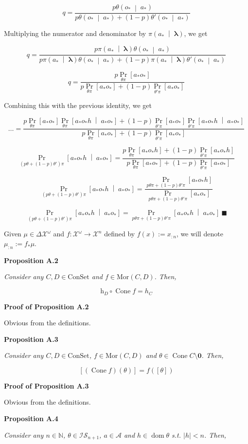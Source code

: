 \documentclass[a4paper]{article}
\newcommand{\Co}[1]{}
\DeclareMathOperator{\Dom}{dom}
\newcommand{\AP}[1]{\left(#1\right)}
\newcommand{\AB}[1]{\left[#1\right]}
\newcommand{\APM}[2]{\left(#1\;\middle\vert\;#2\right)}
\newcommand{\ABM}[2]{\left[#1\;\middle\vert\;#2\right]}
\newcommand{\Abs}[1]{\left\vert #1 \right\vert}
\newcommand{\Pa}[2]{\underset{#1}{\operatorname{Pr}}\AB{#2}}
\newcommand{\CP}[3]{\underset{#1}{\operatorname{Pr}}\ABM{#2}{#3}}
\newcommand{\Nats}{\mathbb{N}}
\newcommand{\Mor}{\mathrm{Mor}}
\newcommand{\Estr}{\boldsymbol{\lambda}} %
\newcommand{\A}{\mathcal{A}}
\newcommand{\Con}{{\boldsymbol{\mathrm{ConSet}}}}
\DeclareMathOperator{\Cone}{Cone}
\newcommand{\Ht}{\mathrm{h}}
\newcommand{\IS}{\mathcal{IS}}
\newcommand{\X}{\mathcal{X}}
\begin{document}
$$q=\frac{p\theta\APM{o_*}{a_*}}{p\theta\APM{o_*}{a_*}+(1-p)\theta'\APM{o_*}{a_*}}$$

Multiplying the numerator and denominator by $\pi\APM{a_*}{\Estr}$, we get

$$q=\frac{p\pi\APM{a_*}{\Estr}\theta\APM{o_*}{a_*}}{p\pi\APM{a_*}{\Estr}\theta\APM{o_*}{a_*}+(1-p)\pi\APM{a_*}{\Estr}\theta'\APM{o_*}{a_*}}$$

$$q=\frac{p\Pa{\theta\pi}{a_*o_*}}{p\Pa{\theta\pi}{a_*o_*}+(1-p)\Pa{\theta'\pi}{a_*o_*}}$$

Combining this with the previous identity, we get 

$$\ldots=\frac{p\Pa{\theta\pi}{a_*o_*}\CP{\theta\pi}{a_*o_*h}{a_*o_*}+(1-p)\Pa{\theta'\pi}{a_*o_*}\CP{\theta'\pi}{a_*o_*h}{a_*o_*}}{p\Pa{\theta\pi}{a_*o_*}+(1-p)\Pa{\theta'\pi}{a_*o_*}}$$

$$\CP{\AP{p\theta+(1-p)\theta'}\pi}{a_*o_*h}{a_*o_*}=\frac{p\Pa{\theta\pi}{a_*o_*h}+(1-p)\Pa{\theta'\pi}{a_*o_*h}}{p\Pa{\theta\pi}{a_*o_*}+(1-p)\Pa{\theta'\pi}{a_*o_*}}$$

$$\CP{\AP{p\theta+(1-p)\theta'}\pi}{a_*o_*h}{a_*o_*}=\frac{\Pa{p\theta\pi+(1-p)\theta'\pi}{a_*o_*h}}{\Pa{p\theta\pi+(1-p)\theta'\pi}{a_*o_*}}$$

$$\CP{\AP{p\theta+(1-p)\theta'}\pi}{a_*o_*h}{a_*o_*}=\CP{p\theta\pi+(1-p)\theta'\pi}{a_*o_*h}{a_*o_*}\ \blacksquare$$

Given $\mu\in\Delta\X^\omega$ and $f:\mathcal{X}^\omega\rightarrow\mathcal{X}^n$ defined by $f(x):=x_{:n}$, we will denote $\mu_{:n}:=f_*\mu$.

\textbf{Proposition A.2}\Co{b}

\textit{Consider any $C,D\in\Con$ and $f\in\Mor(C,D)$. Then,}\Co{i}

$$\Ht_D\circ \Cone f=h_C$$

\textbf{Proof of Proposition A.2}\Co{b}

Obvious from the definitions.

\textbf{Proposition A.3}\Co{b}

\textit{Consider any $C,D\in\Con$, $f\in\Mor(C,D)$ and $\theta\in\Cone C\setminus\boldsymbol{0}$. Then,}\Co{i}

$$\AB{\AP{\Cone f}(\theta)}=f\AP{\AB{\theta}}$$

\textbf{Proof of Proposition A.3}\Co{b}

Obvious from the definitions.

\textbf{Proposition A.4}\Co{b}

\textit{Consider any $n\in\Nats$, $\theta\in\IS_{n+1}$, $a\in\A$ and $h\in\Dom\theta$ s.t. $\Abs{h}< n$. Then,}\Co{i} 
\end{document}

